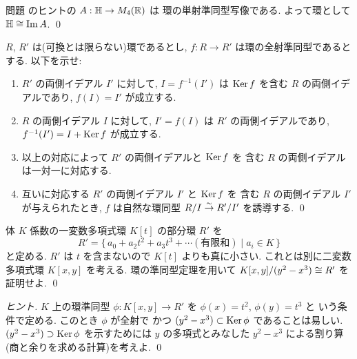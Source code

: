 \documentclass[12pt,twoside]{jarticle}
\begin{document}
\begin{example}
 問題  のヒントの $A:{\mathbb H}\to M_4({\mathbb R})$ は
 環の単射準同型写像である. よって環として ${\mathbb H}\cong\mathop{\mathrm{Im}}\nolimits A$.
 \qed
\end{example}

\begin{question}[両側イデアルの対応]
 \label{q:ring-hom-th-2}
 $R$, $R'$ は(可換とは限らない)環であるとし, 
 $f:R\to R'$ は環の全射準同型であるとする.
 以下を示せ:
 \begin{enumerate}
  \item  $R'$ の両側イデアル $I'$ に対して, 
   $I=f^{-1}(I')$ は $\mathop{\mathrm{Ker}}\nolimits f$ を含む $R$ の両側イデアルであり,
   $f(I)=I'$ が成立する.
  \item $R$ の両側イデアル $I$ に対して, 
   $I'=f(I)$ は $R'$ の両側イデアルであり, 
   $f^{-1}(I')=I+\mathop{\mathrm{Ker}}\nolimits f$ が成立する.
  \item 以上の対応によって $R'$ の両側イデアルと $\mathop{\mathrm{Ker}}\nolimits f$ を
   含む $R$ の両側イデアルは一対一に対応する.
  \item 互いに対応する $R'$ の両側イデアル $I'$ と $\mathop{\mathrm{Ker}}\nolimits f$ を
   含む $R$ の両側イデアル $I'$ が与えられたとき, 
   $f$ は自然な環同型 $R/I\overset\sim\rightarrow R'/I'$ を誘導する.
   \qed
 \end{enumerate}
\end{question}

\begin{question}[カスプ, 20点]
 体 $K$ 係数の一変数多項式環 $K[t]$ の部分環 $R'$ を
 \begin{equation*}
  R' = \{\,a_0 + a_2 t^2 + a_3t^3 + \cdots (\text{有限和}) \mid a_i\in K \,\}
 \end{equation*}
 と定める. $R'$ は $t$ を含まないので $K[t]$ よりも真に小さい.
 これとは別に二変数多項式環 $K[x,y]$ を考える.
 環の準同型定理を用いて $K[x,y]/(y^2-x^3)\cong R'$ を証明せよ.
 \qed
\end{question}

\begin{proof}[ヒント]
 $K$ 上の環準同型 $\phi:K[x,y]\to R'$ を $\phi(x)=t^2$, $\phi(y)=t^3$ と
 いう条件で定める. このとき $\phi$ が全射で
 かつ $(y^2-x^3)\subset\mathop{\mathrm{Ker}}\nolimits\phi$ であることは易しい.
 $(y^2-x^3)\supset\mathop{\mathrm{Ker}}\nolimits\phi$ を示すためには %
 $y$ の多項式とみなした $y^2-x^3$ による割り算(商と余りを求める計算)を考えよ.
 \qed
\end{proof}
\end{document}
